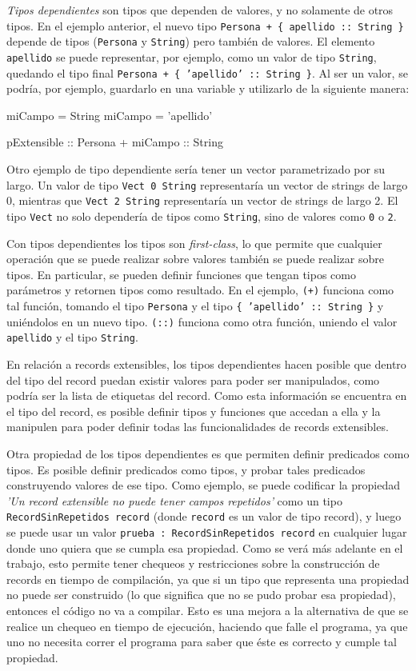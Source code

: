 \textit{Tipos dependientes} son tipos que dependen de valores, y no solamente de otros tipos. En el ejemplo anterior, el nuevo tipo \texttt{Persona + \{ apellido :: String \}} depende de tipos (\texttt{Persona} y \texttt{String}) pero también de valores. El elemento \texttt{apellido} se puede representar, por ejemplo, como un valor de tipo \texttt{String}, quedando el tipo final \texttt{Persona + \{ 'apellido' :: String \}}. Al ser un valor, se podría, por ejemplo, guardarlo en una variable y utilizarlo de la siguiente manera:

\begin{code}
miCampo = String
miCampo = 'apellido'

pExtensible :: Persona + { miCampo :: String }
\end{code}

Otro ejemplo de tipo dependiente sería tener un vector parametrizado por su largo. Un valor de tipo \texttt{Vect 0 String} representaría un vector de strings de largo 0, mientras que \texttt{Vect 2 String} representaría un vector de strings de largo 2. El tipo \texttt{Vect} no solo dependería de tipos como \texttt{String}, sino de valores como \texttt{0} o \texttt{2}.

Con tipos dependientes los tipos son \textit{first-class}, lo que permite que cualquier operación que se puede realizar sobre valores también se puede realizar sobre tipos. En particular, se pueden definir funciones que tengan tipos como parámetros y retornen tipos como resultado. En el ejemplo, \texttt{(+)} funciona como tal función, tomando el tipo \texttt{Persona} y el tipo \texttt{\{ 'apellido' :: String \}} y uniéndolos en un nuevo tipo. \texttt{(::)} funciona como otra función, uniendo el valor \texttt{apellido} y el tipo \texttt{String}.

En relación a records extensibles, los tipos dependientes hacen posible que dentro del tipo del record puedan existir valores para poder ser manipulados, como podría ser la lista de etiquetas del record. Como esta información se encuentra en el tipo del record, es posible definir tipos y funciones que accedan a ella y la manipulen para poder definir todas las funcionalidades de records extensibles.

Otra propiedad de los tipos dependientes es que permiten definir predicados como tipos. Es posible definir predicados como tipos, y probar tales predicados construyendo valores de ese tipo. Como ejemplo, se puede codificar la propiedad \textit{'Un record extensible no puede tener campos repetidos'} como un tipo \texttt{RecordSinRepetidos record} (donde \texttt{record} es un valor de tipo record), y luego se puede usar un valor \texttt{prueba : RecordSinRepetidos record} en cualquier lugar donde uno quiera que se cumpla esa propiedad. Como se verá más adelante en el trabajo, esto permite tener chequeos y restricciones sobre la construcción de records en tiempo de compilación, ya que si un tipo que representa una propiedad no puede ser construido (lo que significa que no se pudo probar esa propiedad), entonces el código no va a compilar. Esto es una mejora a la alternativa de que se realice un chequeo en tiempo de ejecución, haciendo que falle el programa, ya que uno no necesita correr el programa para saber que éste es correcto y cumple tal propiedad.

